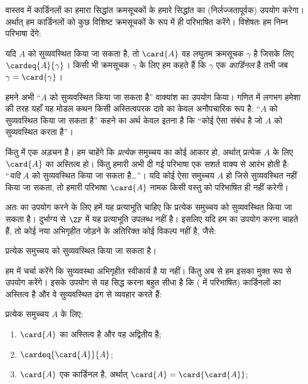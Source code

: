 \documentclass[../../../include/open-logic-section]{subfiles}
\begin{document}

वास्तव में कार्डिनलों का हमारा सिद्धांत क्रमसूचकों के हमारे सिद्धांत का
(निर्लज्जतापूर्वक) उपयोग करेगा। अर्थात् हम कार्डिनलों को कुछ विशिष्ट
क्रमसूचकों के रूप में ही परिभाषित करेंगे। विशेषतः हम निम्न परिभाषा देंगे:

\begin{defn}
यदि $A$ को सुव्यवस्थित किया जा सकता है, तो $\card{A}$ वह लघुतम क्रमसूचक
$\gamma$ है जिसके लिए $\cardeq{A}{\gamma}$। किसी भी क्रमसूचक $\gamma$ के
लिए हम कहते हैं कि $\gamma$ एक \emph{कार्डिनल} है तभी जब
$\gamma = \card{\gamma}$।
\end{defn}

हमने अभी ``$A$ को सुव्यवस्थित किया जा सकता है'' वाक्यांश का उपयोग किया।
गणित में लगभग हमेशा की तरह यहाँ यह मोडल कथन किसी अस्तित्वपरक दावे का केवल
अनौपचारिक रूप है: ``$A$ को सुव्यवस्थित किया जा सकता है'' कहने का अर्थ केवल
इतना है कि ``कोई ऐसा संबंध है जो $A$ को सुव्यवस्थित करता है''।

किंतु  में एक अड़चन है। हम चाहेंगे कि
\emph{प्रत्येक} समुच्चय का कोई आकार हो, अर्थात् प्रत्येक $A$ के लिए
$\card{A}$ का अस्तित्व हो। किंतु हमारी अभी दी गई परिभाषा एक सशर्त वाक्य से
आरंभ होती है: ``\emph{यदि} $A$ को सुव्यवस्थित किया जा सकता है\ldots''। यदि
कोई ऐसा समुच्चय $A$ हो जिसे सुव्यवस्थित नहीं किया जा सकता, तो हमारी परिभाषा
$\card{A}$ नामक किसी वस्तु को परिभाषित ही नहीं करेगी।

अतः  का उपयोग करने के लिए हमें यह प्रत्याभूति
चाहिए कि प्रत्येक समुच्चय को सुव्यवस्थित किया जा सकता है। दुर्भाग्य से
$\ZF$ में यह प्रत्याभूति उपलब्ध नहीं है। इसलिए यदि हम
 का उपयोग करना चाहते हैं, तो कोई नया अभिगृहीत
जोड़ने के अतिरिक्त कोई विकल्प नहीं है, जैसे:
\begin{axiom}
प्रत्येक समुच्चय को सुव्यवस्थित किया जा सकता है।
\end{axiom}
हम  में चर्चा करेंगे कि सुव्यवस्था अभिगृहीत स्वीकार्य
है या नहीं। किंतु अब से हम इसका मुक्त रूप से उपयोग करेंगे। इसके उपयोग से यह
सिद्ध करना बहुत सीधा है कि ( में परिभाषित)
कार्डिनलों का अस्तित्व है और वे सुव्यवस्थित ढंग से व्यवहार करते हैं:

\begin{lem}
प्रत्येक समुच्चय $A$ के लिए:
\begin{enumerate}
	\item{} $\card{A}$ का अस्तित्व है और वह अद्वितीय है;
	\item{}  $\cardeq{\card{A}}{A}$;
	\item{}  $\card{A}$ एक कार्डिनल है, अर्थात्
	$\card{A} = \card{\card{A}}$;
\end{enumerate}
\end{lem}
\end{document}
